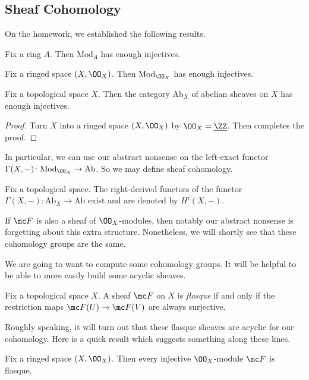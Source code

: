 \documentclass[../notes.tex]{subfiles}
\begin{document}
\subsection{Sheaf Cohomology}
On the homework, we established the following results.
\begin{theorem}
	Fix a ring $A$. Then $\mathrm{Mod}_A$ has enough injectives.
\end{theorem}
\begin{theorem} \label{thm:mod-ox-enough-inj}
	Fix a ringed space $(X,\OO_X)$. Then $\mathrm{Mod}_{\OO_X}$ has enough injectives.
\end{theorem}
\begin{corollary}
	Fix a topological space $X$. Then the category $\mathrm{Ab}_X$ of abelian sheaves on $X$ has enough injectives.
\end{corollary}
\begin{proof}
	Turn $X$ into a ringed space $(X,\OO_X)$ by $\OO_X=\underline\ZZ$. Then  completes the proof.
\end{proof}
In particular, we can use our abstract nonsense on the left-exact functor $\Gamma(X,-)\colon\mathrm{Mod}_{\OO_X}\to\mathrm{Ab}$. So we may define sheaf cohomology.
\begin{definition}
	Fix a topological space. The right-derived functors of the functor $\Gamma(X,-)\colon\mathrm{Ab}_X\to\mathrm{Ab}$ exist and are denoted by $H^i(X,-)$.
\end{definition}
\begin{remark}
	If $\mc F$ is also a sheaf of $\OO_X$-modules, then notably our abstract nonsense is forgetting about this extra structure. Nonetheless, we will shortly see that these cohomology groups are the same.
\end{remark}
We are going to want to compute some cohomology groups. It will be helpful to be able to more easily build some acyclic sheaves.
\begin{definition}[flasque]
	Fix a topological space $X$. A sheaf $\mc F$ on $X$ is \textit{flasque} if and only if the restriction maps $\mc F(U)\to\mc F(V)$ are always surjective.
\end{definition}
Roughly speaking, it will turn out that these flasque sheaves are acyclic for our cohomology. Here is a quick result which suggests something along these lines.
\begin{proposition}
	Fix a ringed space $(X,\OO_X)$. Then every injective $\OO_X$-module $\mc F$ is flasque.
\end{proposition}
\end{document}
